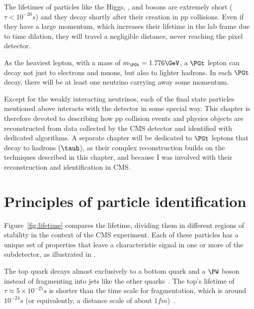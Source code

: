
 \label{sec:objects}

The lifetimes of particles like the Higgs, {\PW}, and {\PZ} bosons are extremely short ($\tau<10^{-20}\unit{s}$) and they decay shortly after their creation in pp collisions. Even if they have a large momentum, which increases their lifetime in the lab frame due to time dilation, they will travel a negligible distance, never reaching the pixel detector.

As the heaviest lepton, with a mass of $m_\PGt = 1.776\GeV$, a $\PGt$ lepton can decay not just to electrons and muons, but also to lighter hadrons. In each $\PGt$ decay, there will be at least one neutrino carrying away some momentum. %

Except for the weakly interacting neutrinos, each of the final state particles mentioned above interacts with the detector in some special way.
This chapter is therefore devoted to describing how pp collision events and physics objects are reconstructed from data collected by the CMS detector and identified with dedicated algorithms.
A separate chapter will be dedicated to $\PGt$ leptons that decay to hadrons ($\tauh$), as their complex reconstruction builds on the techniques described in this chapter, and because I was involved with their reconstruction and identification in CMS.


\section{Principles of particle identification} \label{sec:PID}





Figure~\ref{fig:lifetime} compares the lifetime, dividing them in different regions of stability in the context of the CMS experiment.
Each of these particles has a unique set of properties that leave a characteristic signal in one or more of the subdetector, as illustrated in .


The top quark decays almost exclusively to a bottom quark and a $\PW$ boson instead of fragmenting into jets like the other quarks~\cite{BR_tt}.
The top's lifetime of $\tau\approx5\times10^{-25}\unit{s}$ is shorter than the time scale for fragmentation, which is around $10^{-24}\unit{s}$ (or equivalently, a distance scale of about $1\unit{fm}$)~\cite{hadronization_timescale1,hadronization_timescale2}.


